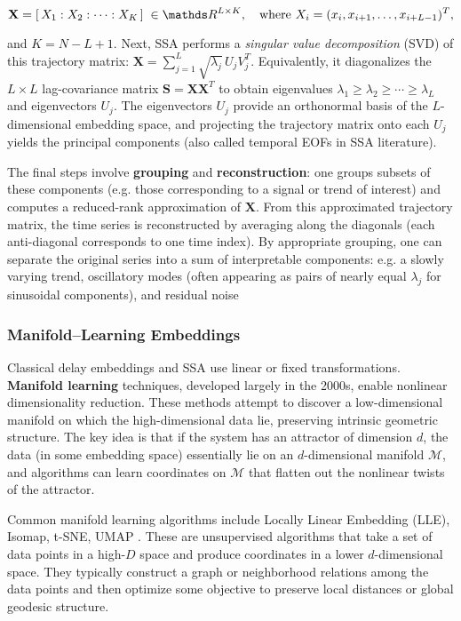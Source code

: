 \documentclass[14pt]{extarticle}
\begin{document}
	$$ 
	\mathbf{X} = [\,X_1 : X_2 : \cdots : X_K\,] \;\in \dR^{L \times K}, \quad \text{where } X_i = (x_i, x_{i+1}, \dots, x_{i+L-1})^T, 
	$$ 
	
	and $K = N - L + 1$. 
	Next, SSA performs a \textit{singular value decomposition} (SVD) of this trajectory matrix: $\mathbf{X} = \sum_{j=1}^L \sqrt{\lambda_j}\,U_j V_j^T$.
	Equivalently, it diagonalizes the $L\times L$ lag-covariance matrix $\mathbf{S} = \mathbf{X}\mathbf{X}^T$ to obtain eigenvalues $\lambda_1 \ge \lambda_2 \ge \cdots \ge \lambda_L$ and eigenvectors $U_j$.
	The eigenvectors $U_j$ provide an orthonormal basis of the $L$-dimensional embedding space, and projecting the trajectory matrix onto each $U_j$ yields the principal components (also called temporal EOFs in SSA literature). 
	
	The final steps involve \textbf{grouping} and \textbf{reconstruction}: one groups subsets of these components (e.g. those corresponding to a signal or trend of interest) and computes a reduced-rank approximation of $\mathbf{X}$. From this approximated trajectory matrix, the time series is reconstructed by averaging along the diagonals (each anti-diagonal corresponds to one time index).
	By appropriate grouping, one can separate the original series into a sum of interpretable components: e.g. a slowly varying trend, oscillatory modes (often appearing as pairs of nearly equal $\lambda_j$ for sinusoidal components), and residual noise
	
	\subsubsection*{Manifold–Learning Embeddings}
	
	Classical delay embeddings and SSA use linear or fixed transformations. \textbf{Manifold learning} techniques, developed largely in the 2000s, enable nonlinear dimensionality reduction. \citep{roweis2000nonlinear}
	These methods attempt to discover a low-dimensional manifold on which the high-dimensional data lie, preserving intrinsic geometric structure.
	The key idea is that if the system has an attractor of dimension $d$, the data (in some embedding space) essentially lie on an $d$-dimensional manifold $\mathcal{M}$, and algorithms can learn coordinates on $\mathcal{M}$ that flatten out the nonlinear twists of the attractor.
	
	Common manifold learning algorithms include Locally Linear Embedding (LLE), Isomap, t-SNE, UMAP \citep{roweis2000nonlinear, balasubramanian2002isomap, van2008visualizing, mcinnes2018umap}.
	These are unsupervised algorithms that take a set of data points in a high-$D$ space and produce coordinates in a lower $d$-dimensional space.
	They typically construct a graph or neighborhood relations among the data points and then optimize some objective to preserve local distances or global geodesic structure.
	
\end{document}
